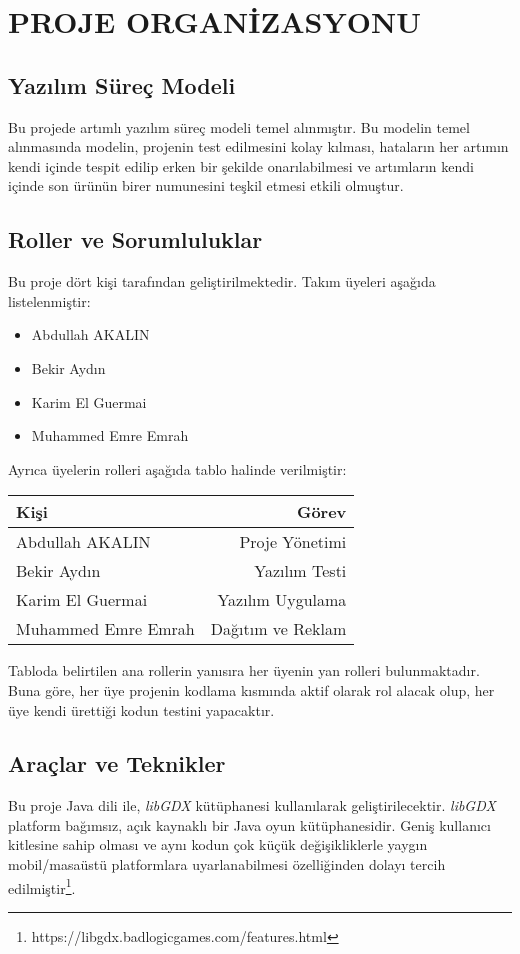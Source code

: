 \documentclass[12pt,a4paper]{article}
\begin{document}
   \section{PROJE ORGANİZASYONU}
   \subsection{Yazılım Süreç Modeli}
   Bu projede artımlı yazılım süreç modeli temel alınmıştır. Bu modelin temel alınmasında modelin, projenin test edilmesini kolay kılması, hataların her artımın kendi içinde tespit edilip erken bir şekilde onarılabilmesi ve artımların kendi içinde son ürünün birer numunesini teşkil etmesi etkili olmuştur. 

   \subsection{Roller ve Sorumluluklar}
   Bu proje dört kişi tarafından geliştirilmektedir. Takım üyeleri aşağıda listelenmiştir:
   \begin{itemize}
      \item Abdullah AKALIN
      \item Bekir Aydın
      \item Karim El Guermai
      \item Muhammed Emre Emrah
   \end{itemize}

   Ayrıca üyelerin rolleri aşağıda tablo halinde verilmiştir:

   \begin{center}
      \begin{tabular}{||l r||}
      \hline
      Kişi & Görev \\[0.5ex]
      \hline\hline
      Abdullah AKALIN & Proje Yönetimi \\
      \hline
      Bekir Aydın & Yazılım Testi \\
      \hline
      Karim El Guermai & Yazılım Uygulama \\
      \hline
      Muhammed Emre Emrah & Dağıtım ve Reklam  \\
      \hline
      \end{tabular}
   \end{center}

   Tabloda belirtilen ana rollerin yanısıra her üyenin yan rolleri bulunmaktadır. Buna göre, her üye projenin kodlama kısmında aktif olarak rol alacak olup, her üye kendi ürettiği kodun testini yapacaktır. 

   \subsection{Araçlar ve Teknikler}
   Bu proje Java dili ile, \textit{libGDX} kütüphanesi kullanılarak geliştirilecektir. \textit{libGDX} platform bağımsız, açık kaynaklı bir Java oyun kütüphanesidir. Geniş kullanıcı kitlesine sahip olması ve aynı kodun çok küçük değişikliklerle yaygın mobil/masaüstü platformlara uyarlanabilmesi özelliğinden dolayı tercih edilmiştir\footnote{https://libgdx.badlogicgames.com/features.html}.
\end{document}
